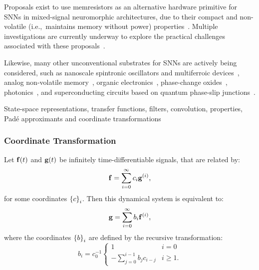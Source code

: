 Proposals exist to use memresistors as an alternative hardware primitive for SNNs in mixed-signal neuromorphic architectures, due to their compact and non-volatile (i.e.,~maintains memory without power) properties~\citep{payvand2018neuromorphic}.
Multiple investigations are currently underway to explore the practical challenges associated with these proposals~\citep[e.g.,][]{chang2013building, kudithipudi2016design, cady2018full, boybat2018neuromorphic}.

Likewise, many other unconventional substrates for SNNs are actively being considered, such as nanoscale spintronic oscillators and multiferroic devices~\citep{torrejon2017neuromorphic, hoppensteadt2017applied, manipatruni2018beyond}, analog non-volatile memory~\citep{ambrogio2018equivalent}, organic electronics~\citep{van2018organic}, phase-change oxides~\citep{zhao2019low}, photonics~\citep{tait2018silicon, shainline2018largest}, and superconducting circuits based on quantum phase-slip junctions~\citep[QPSJs;][]{cheng2019superconducting}.


State-space representations, transfer functions, filters, convolution, properties, Pad\'e approximants and coordinate transformations

\subsubsection{Coordinate Transformation}

\begin{theorem}
Let $\mathbf{f}(t)$ and $\mathbf{g}(t)$ be infinitely time-differentiable signals, that are related by:
\begin{equation} \label{eq:f}
\mathbf{f} = \sum_{i=0}^\infty c_i \mathbf{g}^{(i)} \text{,}
\end{equation}
for some coordinates $\left\{ c \right\}_{i}$. Then this dynamical system is equivalent to:
\begin{equation} \label{eq:g}
\mathbf{g} = \sum_{i=0}^\infty b_i \mathbf{f}^{(i)} \text{,}
\end{equation}
where the coordinates $\left\{ b \right\}_{i}$ are defined by the recursive transformation:
\begin{equation} \label{eq:b}
b_i = c_0^{-1} \begin{cases}
    1 & i = 0 \\
    - \sum_{j=0}^{i-1} b_j c_{i - j} & i \ge 1 \text{.}
  \end{cases}
\end{equation}
\end{theorem}

